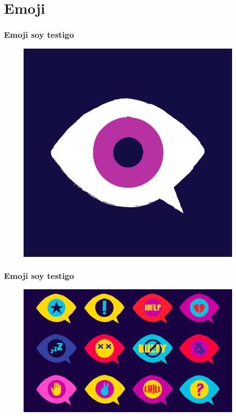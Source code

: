 \documentclass[12pt,spanish,x11names,svgnames]{beamer}
\title{\talktitle}
\subtitle{\talksubtitle}
\author{\talkauthor}
\institute{\talkaffiliation}
\date{\footnotesize{\emph{\href{\talkblog}{\talkemail}}}}
\begin{document}
\begin{frame}
\titlepage
\end{frame}
\section{Emoji}
\begin{frame}
  \frametitle{Emoji soy testigo}
  \begin{figure}[H]
    \centering
    \includegraphics[scale=.35]{emoji}
  \end{figure}
\end{frame}
\begin{frame}
  \frametitle{Emoji soy testigo}
  \begin{figure}[H]
    \centering
    \includegraphics[scale=.51]{eyes}
  \end{figure}
\end{frame}
\end{document}
